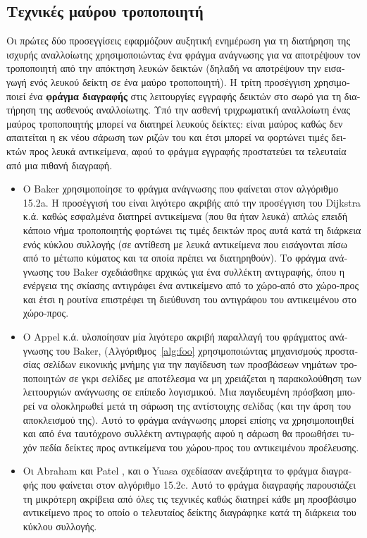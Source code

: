 \begin{greek}
\subsection{Τεχνικές μαύρου τροποποιητή}
Οι πρώτες δύο προσεγγίσεις εφαρμόζουν αυξητική ενημέρωση για
τη διατήρηση της ισχυρής αναλλοίωτης χρησιμοποιώντας ένα φράγμα
ανάγνωσης για να αποτρέψουν τον τροποποιητή από την απόκτηση
λευκών δεικτών (δηλαδή να αποτρέψουν την εισαγωγή ενός λευκού
δείκτη σε ένα μαύρο τροποποιητή). Η τρίτη προσέγγιση χρησιμοποιεί
ένα \textbf{φράγμα διαγραφής} στις λειτουργίες εγγραφής δεικτών
στο σωρό για τη διατήρηση της ασθενούς αναλλοίωτης. Υπό την
ασθενή τριχρωματική αναλλοίωτη ένας μαύρος τροποποιητής μπορεί
να διατηρεί λευκούς δείκτες: είναι μαύρος καθώς δεν απαιτείται
η εκ νέου σάρωση των ριζών του και έτσι μπορεί να φορτώνει
τιμές δεικτών προς λευκά αντικείμενα, αφού το φράγμα εγγραφής
προστατεύει τα τελευταία από μια πιθανή διαγραφή.

\begin{itemize}
\item Ο Baker \cite{DBLP:journals/cacm/Baker78} χρησιμοποίησε
  το φράγμα ανάγνωσης που φαίνεται στον αλγόριθμο 15.2a. Η
  προσέγγισή του είναι λιγότερο ακριβής από την προσέγγιση του
  Dijkstra κ.ά. καθώς εσφαλμένα διατηρεί αντικείμενα (που θα
  ήταν λευκά) απλώς επειδή κάποιο νήμα τροποποιητής φορτώνει
  τις τιμές δεικτών προς αυτά κατά τη διάρκεια ενός κύκλου
  συλλογής (σε αντίθεση με λευκά αντικείμενα που εισάγονται
  πίσω από το μέτωπο κύματος και τα οποία πρέπει να διατηρηθούν).
  Το φράγμα ανάγνωσης του Baker σχεδιάσθηκε αρχικώς για ένα
  συλλέκτη αντιγραφής, όπου η ενέργεια της σκίασης αντιγράφει
  ένα αντικείμενο από το χώρο-από στο χώρο-προς και έτσι η
  ρουτίνα  επιστρέφει τη διεύθυνση του αντιγράφου
  του αντικειμένου στο χώρο-προς. 
\item Ο Appel κ.ά. \cite{DBLP:conf/pldi/AppelEL88} υλοποίησαν
  μία λιγότερο ακριβή παραλλαγή του φράγματος ανάγνωσης του
  Baker, (Αλγόριθμος~\ref{alg:foo} χρησιμοποιώντας μηχανισμούς
  προστασίας σελίδων εικονικής μνήμης για την παγίδευση των
  προσβάσεων νημάτων τροποποιητών σε γκρι σελίδες με αποτέλεσμα
  να μη χρειάζεται η παρακολούθηση των λειτουργιών ανάγνωσης σε
  επίπεδο λογισμικού. Μια παγιδευμένη πρόσβαση μπορεί να
  ολοκληρωθεί μετά τη σάρωση της αντίστοιχης σελίδας (και την
  άρση του αποκλεισμού της). Αυτό το φράγμα ανάγνωσης μπορεί
  επίσης να χρησιμοποιηθεί και από ένα ταυτόχρονο συλλέκτη
  αντιγραφής αφού η σάρωση θα προωθήσει τυχόν πεδία δείκτες
  προς αντικείμενα του χώρου-προς του αντικειμένου προέλευσης.   
\item Οι Abraham και Patel \cite{DBLP:conf/icpp/AbrahamP87},
  και ο Yuasa \cite{DBLP:journals/jss/Yuasa90} σχεδίασαν
  ανεξάρτητα το φράγμα διαγραφής που φαίνεται στον αλγόριθμο
  15.2c. Αυτό το φράγμα διαγραφής παρουσιάζει τη μικρότερη
  ακρίβεια από όλες τις τεχνικές καθώς διατηρεί κάθε μη
  προσβάσιμο αντικείμενο προς το οποίο ο τελευταίος δείκτης
  διαγράφηκε κατά τη διάρκεια του κύκλου συλλογής. 
\end{itemize}


\end{greek}
